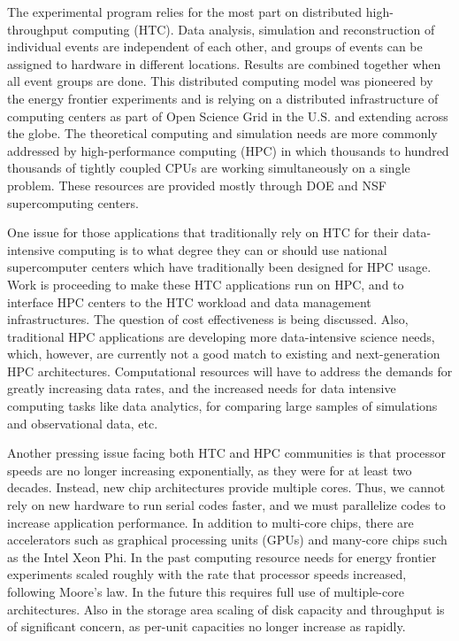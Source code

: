 The experimental program relies for the most part on distributed
high-throughput computing (HTC). Data analysis, simulation and
reconstruction of individual events are independent of each other, and
groups of events can be assigned to hardware in different locations.
Results are combined together when all event groups are done. This
distributed computing model was pioneered by the energy frontier
experiments and is relying on a distributed infrastructure of computing
centers as part of Open Science Grid in the U.S. and extending across the
globe. The theoretical computing and simulation needs are more commonly
addressed by high-performance computing (HPC) in which thousands to hundred
thousands of tightly coupled CPUs are working simultaneously on a single
problem. These resources are provided mostly through DOE and NSF
supercomputing centers.

One issue for those applications that traditionally rely on HTC for their
data-intensive computing is to what degree they can or should use national
supercomputer centers which have traditionally been designed for HPC usage.
Work is proceeding to make these HTC applications run on HPC, and to
interface HPC centers to the HTC workload and data management
infrastructures. The question of cost effectiveness is being discussed.
Also, traditional HPC applications are developing more data-intensive
science needs, which, however, are currently not a good match to existing
and next-generation HPC architectures. Computational resources will have to
address the demands for greatly increasing data rates, and the increased
needs for data intensive computing tasks like data analytics, for comparing
large samples of simulations and observational data, etc.

Another pressing issue facing both HTC and HPC communities is that
processor speeds are no longer increasing exponentially, as they were for
at least two decades. Instead, new chip architectures provide multiple
cores. Thus, we cannot rely on new hardware to run serial codes faster, and
we must parallelize codes to increase application performance. In addition
to multi-core chips, there are accelerators such as graphical processing
units (GPUs) and many-core chips such as the Intel Xeon Phi. 
In the past computing resource needs for energy frontier experiments scaled
roughly with the rate that processor speeds increased, following Moore's
law. In the future this requires full use of multiple-core architectures. Also
in the storage area scaling of disk capacity and throughput is of
significant concern, as per-unit capacities no longer increase as rapidly.

